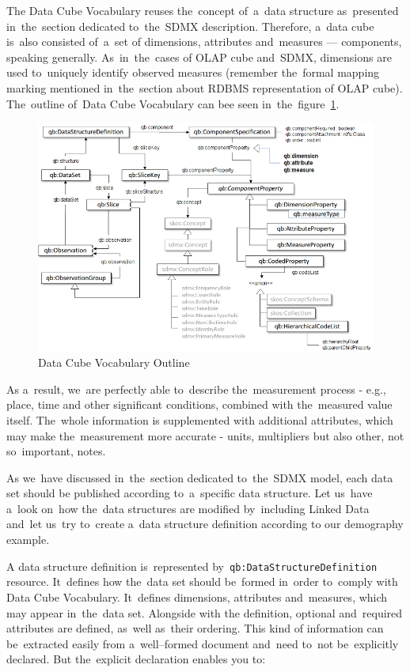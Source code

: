 The Data Cube Vocabulary reuses the~concept of~a~data structure as~presented in~the~section
dedicated to~the~SDMX description. Therefore, a~data cube is~also consisted of~a~set of
dimensions, attributes and~measures --- components, speaking generally. As~in~the~cases of
OLAP cube and~SDMX, dimensions are used to~uniquely identify observed measures
(remember the~formal mapping marking mentioned in~the~section about RDBMS representation
of OLAP cube). The~outline of~Data Cube Vocabulary can bee seen in~the~figure~\ref{fig:lod-cloud}.
 
\begin{figure}
	\centering
	\includegraphics[width=150mm]{img/dcv-schema.png}
	\caption{Data Cube Vocabulary Outline~\cite{dcv}}
	\label{fig:lod-cloud}
\end{figure}

As a~result, we~are perfectly able to~describe the~measurement process - e.g., place, time and
other significant conditions, combined with the~measured value itself. The~whole information
is supplemented with additional attributes, which may make the~measurement more accurate
- units, multipliers but also other, not so~important, notes.

As we~have discussed in~the~section dedicated to~the~SDMX model, each data set should be
published according to~a~specific data structure. Let us~have a~look on~how the~data structures are
modified by~including Linked Data and~let us~try to~create a~data structure definition according
to our demography example.

A data structure definition is~represented by~\texttt{qb:DataStructureDefinition} resource. It~defines
how the~data set should be~formed in~order to~comply with Data Cube Vocabulary. It~defines
dimensions, attributes and~measures, which may appear in~the~data set. Alongside with the
definition, optional and~required attributes are defined, as~well as~their ordering. This kind
of information can be~extracted easily from a~well--formed document and~need to~not be~explicitly
declared. But the~explicit declaration enables you to:

